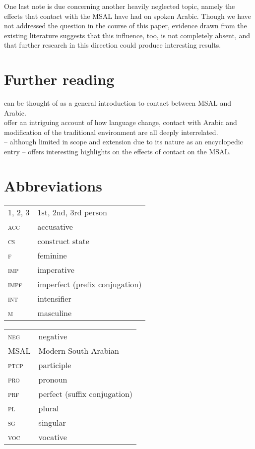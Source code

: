 \documentclass[output=paper]{langsci/langscibook}
\begin{document}
One last note is due concerning another heavily neglected topic, namely the effects that contact with the MSAL have had on spoken Arabic. Though we have not addressed the question in the course of this paper, evidence drawn from the existing literature \citet{Simeone-Senelle2002} suggests that this influence, too, is not completely absent, and that further research in this direction could produce interesting results. 

\section*{Further reading}

 \citet{Morris2017} can be thought of as a general introduction to contact between MSAL and Arabic. \\
 \citet{WatsonAl-Mahri2017} offer an intriguing account of how language change, contact with Arabic and modification of the traditional environment are all deeply interrelated. \\ \citet{Lonnet2011} – although limited in scope and extension due to its nature as an encyclopedic entry – offers interesting highlights on the effects of contact on the MSAL.
 
 
\section*{Abbreviations}

\begin{tabularx}{.5\textwidth}{@{}lQ@{}}
\textsc{1, 2, 3} & 1st, 2nd, 3rd person \\
\textsc{acc} & accusative \\
\textsc{cs} & construct state \\
\textsc{f} & feminine \\
\textsc{imp} & imperative \\
\textsc{impf} & imperfect (prefix conjugation) \\
\textsc{int} & intensifier \\
\textsc{m} & masculine \\
\end{tabularx}%
\begin{tabularx}{.5\textwidth}{@{}lQ@{}}
\textsc{neg} & negative \\
MSAL & Modern South Arabian \\
\textsc{ptcp} & participle \\
\textsc{pro} & pronoun \\
\textsc{prf} & perfect (suffix conjugation) \\
\textsc{pl} & plural \\
\textsc{sg} & singular \\
\textsc{voc} & vocative \\
\end{tabularx}%


\sloppy
\printbibliography[heading=subbibliography,notkeyword=this]
\end{document}
